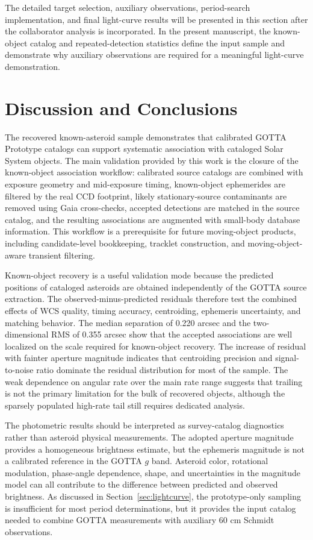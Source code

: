 \documentclass[referee]{raa}
\begin{document}
The detailed target selection, auxiliary observations, period-search implementation, and final light-curve results will be presented in this section after the collaborator analysis is incorporated. In the present manuscript, the known-object catalog and repeated-detection statistics define the input sample and demonstrate why auxiliary observations are required for a meaningful light-curve demonstration.

\section{Discussion and Conclusions}
\label{sec:discussion}

The recovered known-asteroid sample demonstrates that calibrated GOTTA Prototype catalogs can support systematic association with cataloged Solar System objects. The main validation provided by this work is the closure of the known-object association workflow: calibrated source catalogs are combined with exposure geometry and mid-exposure timing, known-object ephemerides are filtered by the real CCD footprint, likely stationary-source contaminants are removed using Gaia cross-checks, accepted detections are matched in the source catalog, and the resulting associations are augmented with small-body database information. This workflow is a prerequisite for future moving-object products, including candidate-level bookkeeping, tracklet construction, and moving-object-aware transient filtering.

Known-object recovery is a useful validation mode because the predicted positions of cataloged asteroids are obtained independently of the GOTTA source extraction. The observed-minus-predicted residuals therefore test the combined effects of WCS quality, timing accuracy, centroiding, ephemeris uncertainty, and matching behavior. The median separation of 0.220 arcsec and the two-dimensional RMS of 0.355 arcsec show that the accepted associations are well localized on the scale required for known-object recovery. The increase of residual with fainter aperture magnitude indicates that centroiding precision and signal-to-noise ratio dominate the residual distribution for most of the sample. The weak dependence on angular rate over the main rate range suggests that trailing is not the primary limitation for the bulk of recovered objects, although the sparsely populated high-rate tail still requires dedicated analysis.

The photometric results should be interpreted as survey-catalog diagnostics rather than asteroid physical measurements. The adopted aperture magnitude provides a homogeneous brightness estimate, but the ephemeris magnitude is not a calibrated reference in the GOTTA $g$ band. Asteroid color, rotational modulation, phase-angle dependence, shape, and uncertainties in the magnitude model can all contribute to the difference between predicted and observed brightness. As discussed in Section~\ref{sec:lightcurve}, the prototype-only sampling is insufficient for most period determinations, but it provides the input catalog needed to combine GOTTA measurements with auxiliary 60 cm Schmidt observations.
\end{document}
